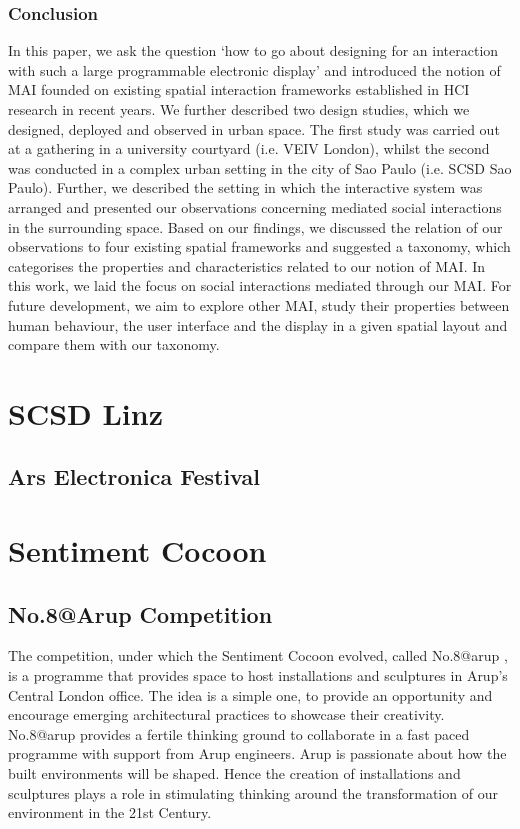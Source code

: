 \subsubsection{Conclusion}
In this paper, we ask the question ‘how to go about designing for an interaction
with such a large programmable electronic display’ and introduced the
notion of MAI founded on existing spatial interaction frameworks established
in HCI research in recent years. We further described two design studies, which
we designed, deployed and observed in urban space. The first study was carried
out at a gathering in a university courtyard (i.e. VEIV London), whilst the second
was conducted in a complex urban setting in the city of Sao Paulo (i.e. SCSD
Sao Paulo). Further, we described the setting in which the interactive system was
arranged and presented our observations concerning mediated social interactions
in the surrounding space. Based on our findings, we discussed the relation of our
observations to four existing spatial frameworks and suggested a taxonomy, which
categorises the properties and characteristics related to our notion of MAI.
In this work, we laid the focus on social interactions mediated through our
MAI. For future development, we aim to explore other MAI, study their properties
between human behaviour, the user interface and the display in a given spatial layout
and compare them with our taxonomy.

\section{SCSD Linz}

\subsection{Ars Electronica Festival}


\section{Sentiment Cocoon}

\subsection{No.8@Arup Competition}

The competition, under which the Sentiment Cocoon evolved, called No.8@arup , is a programme that provides space to host installations and sculptures in Arup’s Central London office. The idea is a simple one, to provide an opportunity and encourage emerging architectural practices to showcase their creativity.
No.8@arup provides a fertile thinking ground to collaborate in a fast paced programme with support from Arup engineers. Arup is passionate about how the built environments will be shaped. Hence the creation of installations and sculptures plays a role in stimulating thinking around the transformation of our environment in the 21st Century.

